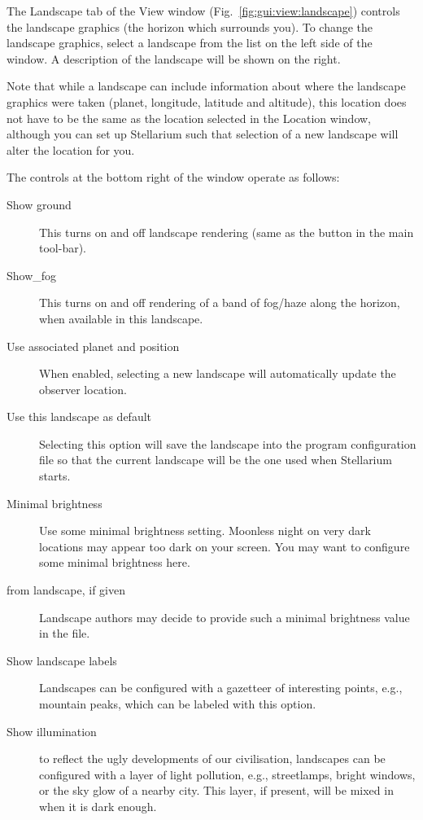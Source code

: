 The Landscape tab of the View window
(Fig.~\ref{fig:gui:view:landscape}) controls the landscape graphics
(the horizon which surrounds you). To change the landscape graphics,
select a landscape from the list on the left side of the window. A
description of the landscape will be shown on the right.

Note that while a landscape  can include information about where the
landscape graphics were taken (planet, longitude, latitude and
altitude), this location does not have to be the same as the location
selected in the Location window, although you can set up Stellarium such
that selection of a new landscape will alter the location for you.

The controls at the bottom right of the window operate as follows:

\begin{description}
\item[Show ground] This turns on and off landscape rendering (same
  as the button  in the main tool-bar).
\item[Show\_fog] This turns on and off rendering of a band of
  fog/haze along the horizon, when available in this landscape.
\item[Use associated planet and position] When enabled, selecting a
  new landscape will automatically update the observer location.
\item[Use this landscape as default] Selecting this option will save
  the landscape into the program configuration file so that the current
  landscape will be the one used when Stellarium starts.
\item[Minimal brightness] Use some minimal brightness
  setting. Moonless night on very dark locations may appear too dark
  on your screen. You may want to configure some minimal brightness
  here.
\item[from landscape, if given] Landscape authors may decide to
  provide such a minimal brightness value in the 
  file.
\item[Show landscape labels] Landscapes can be configured with a
  gazetteer of interesting points, e.g., mountain peaks, which can be
  labeled with this option.
\item[Show illumination] to reflect the ugly developments of our
  civilisation, landscapes can be configured with a layer of light
  pollution, e.g., streetlamps, bright windows, or the sky glow of a
  nearby city. This layer, if present, will be mixed in when it is
  dark enough.
\end{description}

